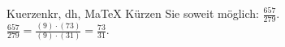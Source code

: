 \begin{MAufgabe}{Kuerzen}{kr, dh, MaTeX}
K\"urzen Sie soweit m\"oglich: $\frac{657}{279}$.\\ 
\ifLsg\MLoesung
\quad $\frac{657}{279}=\frac{(9)\cdot(73)}{(9)\cdot(31)}=\frac{73}{31}$.\else\relax\fi
 \end{MAufgabe}